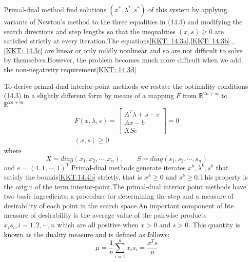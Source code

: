 Primal-dual method find solutions $(x^*, \lambda^*, s^*)$ of this system by applying variants of Newton's method to the
three equalities in (14.3) and modifying the search directions and step lengths so that the inequalities
$(x, s) \geq 0$ are satisfied strictly at every iteration.The equations\eqref{KKT: 14.3a},\eqref{KKT: 14.3b}
,\eqref{KKT: 14.3c} are linear or only mildly nonlinear and so are not difficult to solve by themselves.However, the problem
becomes much more difficult when we add the non-negativity requirement\eqref{KKT: 14.3d}
\par To derive primal-dual interior-point methods we restate the optimality conditions (14.3) in a slightly different form
by means of a mapping $F$ from $\mathbb{R}^{2n + m}$ to $\mathbb{R}^{2n + m}$
\begin{align}
    F(x, \lambda, s) =
    \begin{bmatrix}
        A^T\lambda + s - c\\
        Ax - b \\
        XSe
    \end{bmatrix} = 0 \tag{14.4a}\label{KKT: 14.4a}\\
    (x, s) \tag{14.4b} \label{KKT:14.4b}\geq 0
\end{align}
where
\[
    X = diag(x_1, x_2,\cdots,x_n), \qquad S = diag(s_1, s_2, \cdots, s_n) \tag{14.5}\label{KKT: 14.5}
\]
and $e = (1,1,\cdots, 1)^T$.Primal-dual methods generate iterates $x^k, \lambda^k, s^k $ that satisfy the
bounds\eqref{KKT:14.4b} strictly, that is $x^k \geq 0$ and $s^k \geq 0$.This property is the origin of the term
interior-point.The primal-dual interior point methods have two basic ingredients: a procedure for determining the step
and a measure of desirability of each point in the search space.An important component of hte measure of desirability
is the average value of the pairwise products $x_i s_i ,i = 1,2,\cdots ,n $ which are all positive when $x > 0$ and $s > 0$.
This quantity is known as the duality measure and is defined as follows:
\[
    \mu = \frac{1}{n} \sum_{i=1}^n x_i s_i = \frac{x^T s}{n} \tag{14.6} \label{ipm: 14.6}
\]